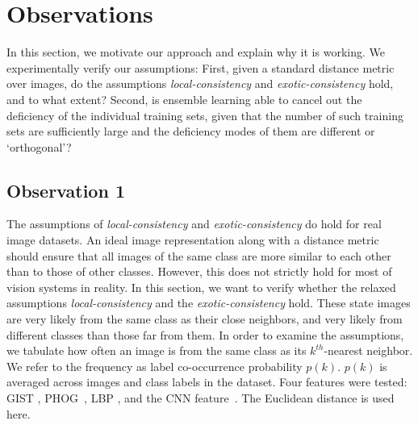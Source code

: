 \documentclass[preprint,12pt,3p]{elsarticle}
\begin{document}



\section{Observations}
\label{sec:observations}

\label{sec:observation} In this section, we motivate our approach and explain why it is
working. We experimentally verify our assumptions: First, given a
standard distance metric over images, do the assumptions
\emph{local-con\-sist\-ency} and \emph{exotic-con\-sistency}
hold, and to what extent? Second, is ensemble learning able to cancel
out the deficiency of the individual training sets, given that the
number of such training sets are sufficiently large and the deficiency
modes of them are different or `orthogonal'?

\subsection{Observation 1}
\label{sec:mov1}
The assumptions of \emph{local-consistency} and
\emph{exotic-consist\-ency} do hold for real image datasets.  An
ideal image representation along with a distance metric should ensure
that all images of the same class are more similar to each other
than to those of other classes. However, this does not strictly hold for
most of vision systems in reality. In this section, we want to verify
whether the relaxed assumptions 
\emph{local-consistency} and the \emph{exotic-consistency} hold. 
These state images are very likely from the same class as their close
neighbors, and very likely from different classes than those far from them. 
In order to examine the assumptions, we tabulate how often an
image is from the same class as its $k^{th}$-nearest neighbor.  We
refer to the frequency as label co-occurrence probability $p(k)$.
$p(k)$ is averaged across images and class labels in the dataset. Four
features were tested: GIST \citep{gist}, PHOG~\citep{Bosch:iccv07},
LBP \citep{Ojala02}, and the CNN feature~\citep{deep:bmvc14}. 
The Euclidean distance is used here.
\end{document}
